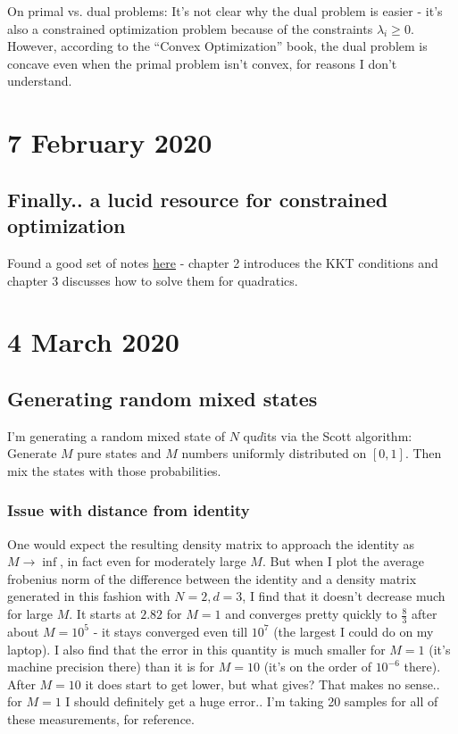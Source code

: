 \documentclass{report}
\begin{document}
On primal vs. dual problems: It's not clear why the dual problem is easier - it's also a constrained optimization problem because of the constraints $\lambda_i\geq 0$. However, according to the ``Convex Optimization'' book, the dual problem is concave even when the primal problem isn't convex, for reasons I don't understand.

\chapter{7 February 2020}

\section{Finally.. a lucid resource for constrained optimization}

Found a good set of notes \href{https://www.math.uh.edu/~rohop/fall_06/}{here} - chapter 2 introduces the KKT conditions and chapter 3 discusses how to solve them for quadratics.

\chapter{4 March 2020}

\section{Generating random mixed states}

I'm generating a random mixed state of $N$ qu$d$its via the Scott algorithm: Generate $M$ pure states and $M$ numbers uniformly distributed on $[0,1]$. Then mix the states with those probabilities. 

\subsection{Issue with distance from identity}

One would expect the resulting density matrix to approach the identity as $M\to \inf$, in fact even for moderately large $M$. But when I plot the average frobenius norm of the difference between the identity and a density matrix generated in this fashion with $N=2,d=3$, I find that it doesn't decrease much for large $M$. It starts at $2.82$ for $M=1$ and converges pretty quickly to $\frac{8}{3}$ after about $M=10^5$ - it stays converged even till $10^7$ (the largest I could do on my laptop). I also find that the error in this quantity is much smaller for $M=1$ (it's machine precision there) than it is for $M=10$ (it's on the order of $10^{-6}$ there). After $M=10$ it does start to get lower, but what gives? That makes no sense.. for $M=1$ I should definitely get a huge error.. I'm taking 20 samples for all of these measurements, for reference. 
\end{document}
